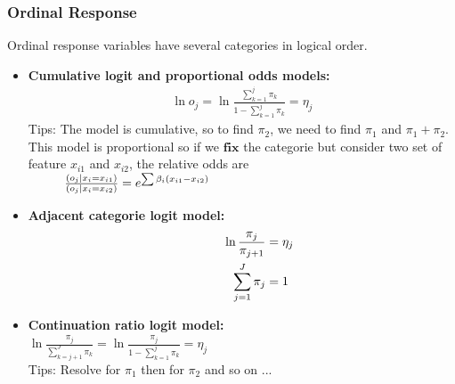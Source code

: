 \documentclass[10pt, french]{article}
\begin{document}
\begin{multicols*}{3}
\subsubsection*{Ordinal Response}
Ordinal response variables have several categories in logical order.
\begin{itemize}[align=left,leftmargin=*]
  \item \textbf{Cumulative logit and proportional odds models:}
  \begin{align*}
    \ln o_j = \ln \frac{\sum_{k=1}^j \pi_k}{1-\sum_{k=1}^j \pi_k} = \eta_j
  \end{align*}
  Tips: The model is cumulative, so to find $\pi_{2}$, we need to find $\pi_{1}$ and $\pi_{1}+\pi_{2}$. \\
  This model is proportional so if we $\textbf{fix}$ the categorie but consider two set of feature $x_{i1}$ and $x_{i2}$, the relative odds are \\
  $\hspace*{1cm} \frac{(o_j|x_i=x_{i1})}{(o_j|x_i=x_{i2})} = e^{\sum \beta_i (x_{i1} - x_{i2})}$
  \item \textbf{Adjacent categorie logit model:}  \\
  \begin{align*}
    \hspace*{1cm}
    \ln \frac{\pi_j}{\pi_{j+1}} &= \eta_j \\
    \sum_{j=1}^J \pi_j &= 1
  \end{align*}
  \item \textbf{Continuation ratio logit model:} \\
  \hspace*{0.5cm}
    $\ln \frac{\pi_j}{\sum_{k=j+1}^J \pi_k} = \ln \frac{\pi_j}{1 - \sum_{k=1}^j \pi_k} = \eta_j$ \\
    Tips: Resolve for $\pi_1$ then for $\pi_2$ and so on ...
\end{itemize}
\columnbreak


\end{multicols*}
\end{document}
